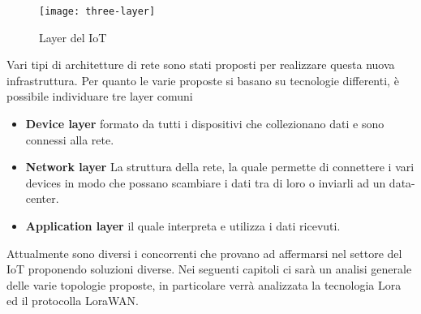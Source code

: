 \begin{figure}[h]
\centering 
\texttt{[image: three-layer]}
\caption{Layer del IoT}
\end{figure}

Vari tipi di architetture di rete sono stati proposti per realizzare questa
nuova infrastruttura. Per quanto le varie proposte si basano su tecnologie
differenti, è possibile individuare tre layer comuni 
\begin{itemize}
\item \textbf{Device layer} formato da tutti i dispositivi che collezionano dati
e sono connessi alla rete.
\item \textbf{Network layer} La struttura della rete, la quale permette di
connettere i vari devices in modo che possano scambiare i dati tra di loro o
inviarli ad un data-center.
\item \textbf{Application layer} il quale interpreta e utilizza i dati ricevuti.
\end{itemize}

Attualmente sono diversi i concorrenti che provano ad affermarsi nel settore
del IoT proponendo soluzioni diverse. Nei seguenti capitoli ci sarà un analisi
generale delle varie topologie proposte, in particolare verrà analizzata la
tecnologia Lora ed il protocolla LoraWAN.

